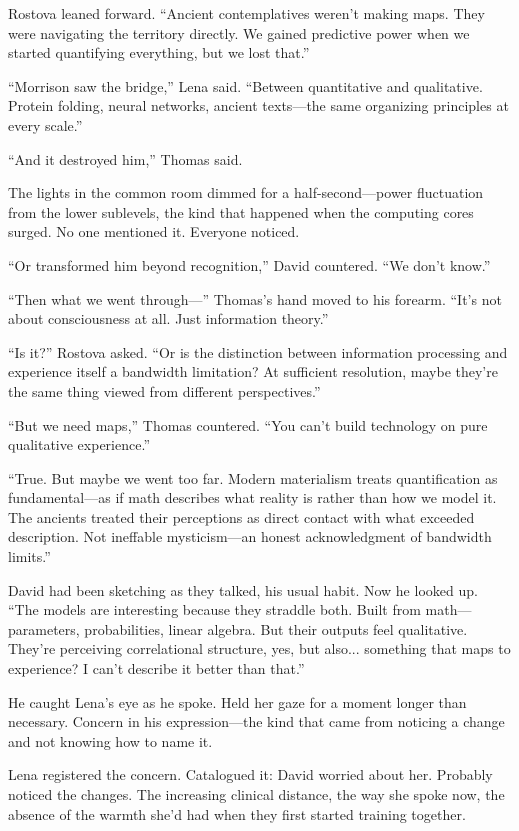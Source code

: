 Rostova leaned forward. ``Ancient contemplatives weren't making maps. They were navigating the territory directly. We gained predictive power when we started quantifying everything, but we lost that.''

``Morrison saw the bridge,'' Lena said. ``Between quantitative and qualitative. Protein folding, neural networks, ancient texts—the same organizing principles at every scale.''

``And it destroyed him,'' Thomas said.

The lights in the common room dimmed for a half-second---power fluctuation from the lower sublevels, the kind that happened when the computing cores surged. No one mentioned it. Everyone noticed.

``Or transformed him beyond recognition,'' David countered. ``We don't know.''

``Then what we went through—'' Thomas's hand moved to his forearm. ``It's not about consciousness at all. Just information theory.''

``Is it?'' Rostova asked. ``Or is the distinction between information processing and experience itself a bandwidth limitation? At sufficient resolution, maybe they're the same thing viewed from different perspectives.''

``But we need maps,'' Thomas countered. ``You can't build technology on pure qualitative experience.''

``True. But maybe we went too far. Modern materialism treats quantification as fundamental—as if math describes what reality is rather than how we model it. The ancients treated their perceptions as direct contact with what exceeded description. Not ineffable mysticism—an honest acknowledgment of bandwidth limits.''

David had been sketching as they talked, his usual habit. Now he looked up. ``The models are interesting because they straddle both. Built from math—parameters, probabilities, linear algebra. But their outputs feel qualitative. They're perceiving correlational structure, yes, but also... something that maps to experience? I can't describe it better than that.''

He caught Lena's eye as he spoke. Held her gaze for a moment longer than necessary. Concern in his expression—the kind that came from noticing a change and not knowing how to name it.

Lena registered the concern. Catalogued it: David worried about her. Probably noticed the changes. The increasing clinical distance, the way she spoke now, the absence of the warmth she'd had when they first started training together.

